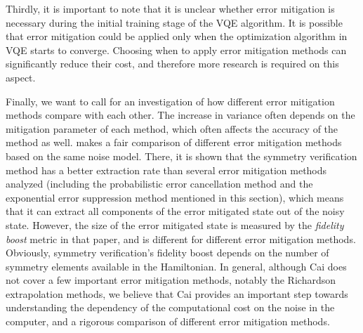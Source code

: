Thirdly, it is important to note that it is unclear whether error mitigation is necessary during the initial training stage of the VQE algorithm. It is possible that error mitigation could be applied only when the optimization algorithm in VQE starts to converge. Choosing when to apply error mitigation methods can significantly reduce their cost, and therefore more research is required on this aspect. 

Finally, we want to call for an investigation of how different error mitigation methods compare with each other. The increase in variance often depends on the mitigation parameter of each method, which often affects the accuracy of the method as well. \citet{cai2021practical} makes a fair comparison of different error mitigation methods based on the same noise model. There, it is shown that the symmetry verification method has a better extraction rate than several error mitigation methods analyzed (including the probabilistic error cancellation method and the exponential error suppression method mentioned in this section), which means that it can extract all components of the error mitigated state out of the noisy state. However, the size of the error mitigated state is measured by the \textit{fidelity boost} metric in that paper, and is different for different error mitigation methods. Obviously,
symmetry verification's fidelity boost depends on the number of symmetry elements available in the Hamiltonian.
In general, although Cai \cite{cai2021practical} does not cover a few important error mitigation methods, notably the Richardson extrapolation methods, we believe that Cai provides an important step towards understanding the dependency of the computational cost on the noise in the computer, and a rigorous comparison of different error mitigation methods.

